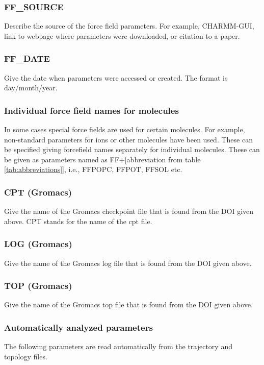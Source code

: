 \documentclass[fleqn,10pt]{wlscirep}
\begin{document}
\subsubsection*{FF\_SOURCE}
Describe the source of the force field parameters. For example, CHARMM-GUI, link to webpage where parameters were downloaded, or citation to a paper.

\subsubsection*{FF\_DATE}
Give the date when parameters were accessed or created. The format is day/month/year.

\subsubsection*{Individual force field names for molecules}
In some cases special force fields are used for certain molecules. For example, non-standard parameters for ions or other molecules have been used. These can be specified giving forcefield names separately for individual molecules. These can be given as parameters named as
FF+[abbreviation from table \ref{tab:abbreviations}], i.e., FFPOPC, FFPOT, FFSOL etc.

\subsubsection*{CPT (Gromacs)}
Give the name of the Gromacs checkpoint file that is found from the DOI given above.
CPT stands for the name of the cpt file. 

\subsubsection*{LOG (Gromacs)}
Give the name of the Gromacs log file that is found from the DOI given above.

\subsubsection*{TOP (Gromacs)}
Give the name of the Gromacs top file that is found from the DOI given above.



\subsubsection{Automatically analyzed parameters}
The following parameters are read automatically from the trajectory and topology files.
\end{document}
